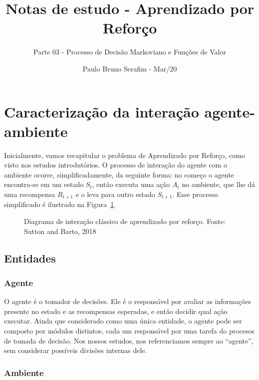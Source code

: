 \documentclass{article}
\title{Notas de estudo - Aprendizado por Reforço}
\author{Parte 03 - Processo de Decisão Markoviano e Funções de Valor}
\date{Paulo Bruno Serafim - Mar/20}
\begin{document}
\maketitle

    \section{Caracterização da interação agente-ambiente}
    
        Inicialmente, vamos recapitular o problema de Aprendizado por Reforço, como visto nos estudos introdutórios. O processo de interação do agente com o ambiente ocorre, simplificadamente, da seguinte forma: no começo o agente encontra-se em um estado $S_t$, então executa uma ação $A_t$ no ambiente, que lhe dá uma recompensa $R_{t+1}$ e o leva para outro estado $S_{t+1}$. Esse processo simplificado é ilustrado na Figura~\ref{diag:classical-rl}.
                
        \begin{figure}[ht]
            \centering
            \vspace*{5mm}
            \rlinteraction
            \vspace*{-5mm}
            \caption{Diagrama de interação clássico de aprendizado por reforço. Fonte: Sutton and Barto, 2018}
            \label{diag:classical-rl}
        \end{figure}
        
        \subsection{Entidades}
            
            \subsubsection{Agente}
            
                O agente é o tomador de decisões. Ele é o responsável por avaliar as informações presente no estado e as recompensas esperadas, e então decidir qual ação executar. Ainda que considerado como uma única entidade, o agente pode ser composto por módulos distintos, cada um responsável por uma tarefa do procesos de tomada de decisão. Nos nossos estudos, nos referenciamos sempre ao ``agente'', sem considerar possíveis divisões internas dele.
            
            \subsubsection{Ambiente}
            
\end{document}
